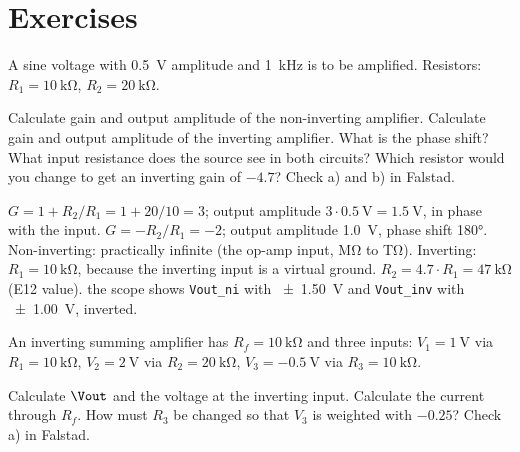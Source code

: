 \section{Exercises}

\label{ex:opamp-basic}
A sine voltage with \SI{0.5}{\volt} amplitude and \SI{1}{\kilo\hertz} is to be
amplified. Resistors: $R_1 = \SI{10}{\kilo\ohm}$, $R_2 = \SI{20}{\kilo\ohm}$.
\begin{talist}
\ta Calculate gain and output amplitude of the non-inverting amplifier.
\ta Calculate gain and output amplitude of the inverting amplifier. What is the phase shift?
\ta What input resistance does the source see in both circuits?
\ta Which resistor would you change to get an inverting gain of $-4.7$?
\ta Check a) and b) in Falstad.
\end{talist}

\begin{solution}
\begin{talist}
\ta $G = 1 + R_2/R_1 = 1 + 20/10 = 3$; output amplitude $3\cdot\SI{0.5}{\volt} = \SI{1.5}{\volt}$, in phase with the input.
\ta $G = -R_2/R_1 = -2$; output amplitude \SI{1.0}{\volt}, phase shift \ang{180}.
\ta Non-inverting: practically infinite (the op-amp input, \si{\mega\ohm} to \si{\tera\ohm}).
    Inverting: $R_1 = \SI{10}{\kilo\ohm}$, because the inverting input is a virtual ground.
\ta $R_2 = 4.7\cdot R_1 = \SI{47}{\kilo\ohm}$ (E12 value).
\ta {}\newline the scope shows \texttt{Vout\_ni} with \SI{\pm 1.50}{\volt} and
    \texttt{Vout\_inv} with \SI{\pm 1.00}{\volt}, inverted.
\end{talist}
\end{solution}

\label{ex:opamp-summing}
An inverting summing amplifier has $R_f = \SI{10}{\kilo\ohm}$ and three inputs:
$V_1 = \SI{1}{\volt}$ via $R_1=\SI{10}{\kilo\ohm}$, $V_2 = \SI{2}{\volt}$ via
$R_2 = \SI{20}{\kilo\ohm}$, $V_3 = \SI{-0.5}{\volt}$ via $R_3 = \SI{10}{\kilo\ohm}$.
\begin{talist}
\ta Calculate $\Vout$ and the voltage at the inverting input.
\ta Calculate the current through $R_f$.
\ta How must $R_3$ be changed so that $V_3$ is weighted with $-0.25$?
\ta Check a) in Falstad.
\end{talist}

